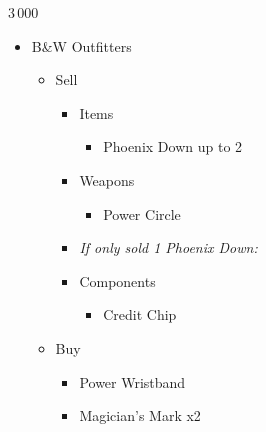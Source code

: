 	\begin{shop}{3\,000}
		\begin{itemize}
			\item B\&W Outfitters
			      \begin{itemize}
				      \item Sell
				            \begin{itemize}
					            \item Items
					                  \begin{itemize}
						                  \item Phoenix Down up to 2
					                  \end{itemize}
					            \item Weapons
					                  \begin{itemize}
						                  \item Power Circle
					                  \end{itemize}
					            \item \textit{If only sold 1 Phoenix Down:}
					            \item Components
					                  \begin{itemize}
						                  \item Credit Chip
					                  \end{itemize}
				            \end{itemize}
				      \item Buy
				            \begin{itemize}
					            \item Power Wristband
					            \item Magician's Mark x2
				            \end{itemize}
			      \end{itemize}
		\end{itemize}
	\end{shop}
